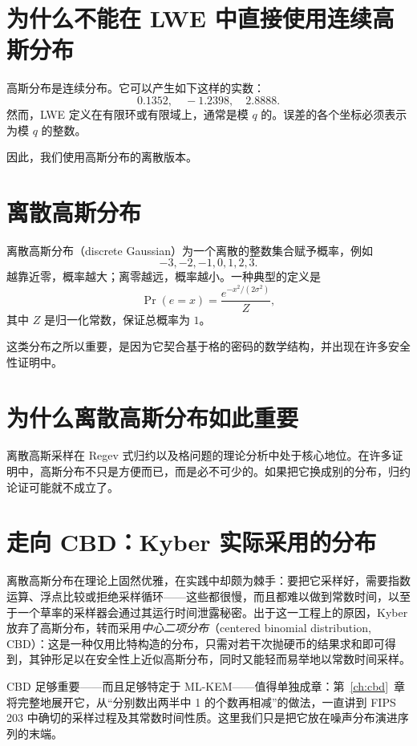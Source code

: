 \section{为什么不能在 LWE 中直接使用连续高斯分布}

高斯分布是连续分布。它可以产生如下这样的实数：
\[
0.1352,
\quad -1.2398,
\quad 2.8888.
\]
然而，LWE 定义在有限环或有限域上，通常是模 $q$ 的。误差的各个坐标必须表示为模 $q$ 的整数。

因此，我们使用高斯分布的离散版本。

\section{离散高斯分布}

离散高斯分布（discrete Gaussian）为一个离散的整数集合赋予概率，例如
\[
-3,-2,-1,0,1,2,3.
\]
越靠近零，概率越大；离零越远，概率越小。一种典型的定义是
\[
\Pr(e=x) = \frac{e^{-x^2/(2\sigma^2)}}{Z},
\]
其中 $Z$ 是归一化常数，保证总概率为 $1$。

这类分布之所以重要，是因为它契合基于格的密码的数学结构，并出现在许多安全性证明中。

\section{为什么离散高斯分布如此重要}

离散高斯采样在 Regev 式归约以及格问题的理论分析中处于核心地位。在许多证明中，高斯分布不只是方便而已，而是必不可少的。如果把它换成别的分布，归约论证可能就不成立了。

\section{走向 CBD：Kyber 实际采用的分布}

离散高斯分布在理论上固然优雅，在实践中却颇为棘手：要把它采样好，需要指数运算、浮点比较或拒绝采样循环——这些都很慢，而且都难以做到常数时间，以至于一个草率的采样器会通过其运行时间泄露秘密。出于这一工程上的原因，Kyber 放弃了高斯分布，转而采用\emph{中心二项分布}（centered binomial distribution, CBD）：这是一种仅用比特构造的分布，只需对若干次抛硬币的结果求和即可得到，其钟形足以在安全性上近似高斯分布，同时又能轻而易举地以常数时间采样。

CBD 足够重要——而且足够特定于 ML-KEM——值得单独成章：第~\ref{ch:cbd}~章将完整地展开它，从“分别数出两半中 1 的个数再相减”的做法，一直讲到 FIPS 203 中确切的采样过程及其常数时间性质。这里我们只是把它放在噪声分布演进序列的末端。

